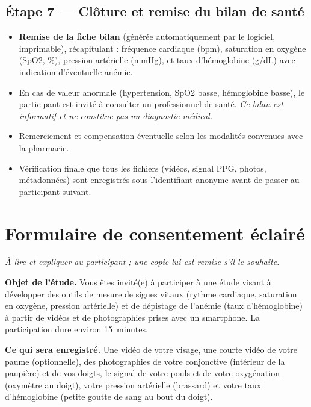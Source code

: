 \documentclass[11pt,a4paper]{article}
\begin{document}
\subsection{Étape 7 --- Clôture et remise du bilan de santé}
\label{sec:cloture}
\begin{itemize}
\item \textbf{Remise de la fiche bilan} (générée automatiquement par le logiciel,
imprimable), récapitulant : fréquence cardiaque (bpm), saturation en oxygène
(SpO2, \%), pression artérielle (mmHg), et taux d'hémoglobine (g/dL) avec
indication d'éventuelle anémie.
\item En cas de valeur anormale (hypertension, SpO2 basse, hémoglobine basse), le
participant est invité à consulter un professionnel de santé. \emph{Ce bilan est
informatif et ne constitue pas un diagnostic médical.}
\item Remerciement et compensation éventuelle selon les modalités convenues avec
la pharmacie.
\item Vérification finale que tous les fichiers (vidéos, signal PPG, photos,
métadonnées) sont enregistrés sous l'identifiant anonyme avant de passer au
participant suivant.
\end{itemize}

\section{Formulaire de consentement éclairé}
\label{sec:consent}

\noindent\textit{À lire et expliquer au participant ; une copie lui est remise
s'il le souhaite.}

\vspace{0.4cm}
\noindent\textbf{Objet de l'étude.}
Vous êtes invité(e) à participer à une étude visant à développer des outils de
mesure de signes vitaux (rythme cardiaque, saturation en oxygène, pression
artérielle) et de dépistage de l'anémie (taux d'hémoglobine) à partir de vidéos
et de photographies prises avec un smartphone. La participation dure environ
15~minutes.

\vspace{0.3cm}
\noindent\textbf{Ce qui sera enregistré.}
Une vidéo de votre visage, une courte vidéo de votre paume (optionnelle), des
photographies de votre conjonctive (intérieur de la paupière) et de vos doigts,
le signal de votre pouls et de votre oxygénation (oxymètre au doigt), votre
pression artérielle (brassard) et votre taux d'hémoglobine (petite goutte de sang
au bout du doigt).
\end{document}
